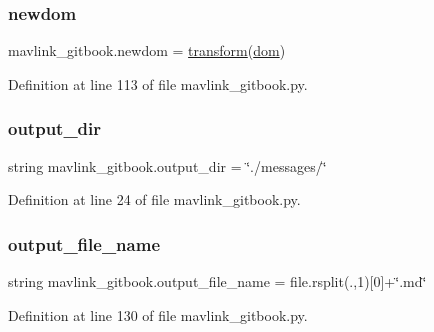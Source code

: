 \subsubsection{\texorpdfstring{newdom}{newdom}}
{\footnotesize\ttfamily mavlink\+\_\+gitbook.\+newdom = \mbox{\hyperlink{namespacemavlink__gitbook_a3dbbd9ffdef79cdd3d0bc10c5eac95e6}{transform}}(\mbox{\hyperlink{namespacemavlink__gitbook_a5f783465a58c3fc0dc9a7c5513c06e77}{dom}})}



Definition at line 113 of file mavlink\+\_\+gitbook.\+py.

\mbox{\label{namespacemavlink__gitbook_a038f966b01c8835bbafb0d301aafc036}} 
\subsubsection{\texorpdfstring{output\_dir}{output\_dir}}
{\footnotesize\ttfamily string mavlink\+\_\+gitbook.\+output\+\_\+dir = \char`\"{}./messages/\char`\"{}}



Definition at line 24 of file mavlink\+\_\+gitbook.\+py.

\mbox{\label{namespacemavlink__gitbook_a65b46bdd34434cd895d50866a39e1fc5}} 
\subsubsection{\texorpdfstring{output\_file\_name}{output\_file\_name}}
{\footnotesize\ttfamily string mavlink\+\_\+gitbook.\+output\+\_\+file\+\_\+name = file.\+rsplit(\textquotesingle{}.\textquotesingle{},1)\mbox{[}0\mbox{]}+\char`\"{}.md\char`\"{}}



Definition at line 130 of file mavlink\+\_\+gitbook.\+py.

\mbox{\label{namespacemavlink__gitbook_a2413062a1a5a2b6580e3bfa5b8240049}} 
